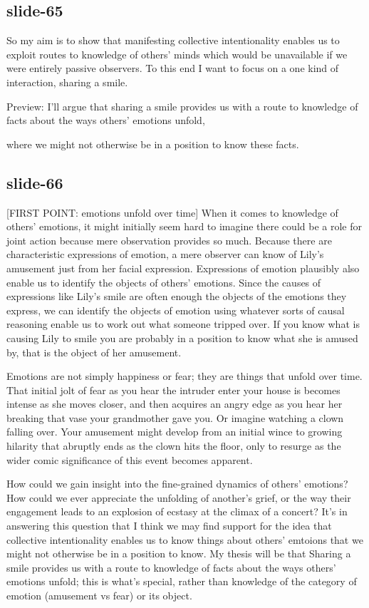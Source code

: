 \documentclass[12pt,\papersize]{extarticle}
\begin{document}
\subsection{slide-65}
So my aim is to show that manifesting collective intentionality enables us to exploit routes to knowledge of others' minds
which would be unavailable if we were entirely passive observers.
To this end I want to focus on a one kind of interaction, sharing a smile.

Preview: I'll argue that sharing a smile provides us with a route to knowledge of facts about the ways others' emotions unfold,

where we might not otherwise be in a position to know these facts.

\subsection{slide-66}
[FIRST POINT: emotions unfold over time]
When it comes to knowledge of others’ emotions, it might initially seem hard to imagine there could be a role for joint action because mere observation provides so much.
Because there are characteristic expressions of emotion, a mere observer can know of Lily’s amusement just from her facial expression.
Expressions of emotion plausibly also enable us to identify the objects of others’ emotions.
Since the causes of expressions like Lily’s smile are often enough the objects of the emotions they express,
we can identify the objects of emotion using whatever sorts of causal reasoning enable us to work out what someone tripped over.
If you know what is causing Lily to smile you are probably in a position to know what she is amused by, that is the object of her amusement.

Emotions are not simply happiness or fear; they are things that unfold over time.
That initial jolt of fear as you hear the intruder enter your house is becomes intense as she moves closer, and then acquires an angry edge as you hear her breaking that vase your grandmother gave you.
Or imagine watching a clown falling over.  Your amusement might develop from an initial wince to growing hilarity that abruptly ends as the clown hits the floor, only to resurge as the wider comic significance of this event becomes apparent.

How could we gain insight into the fine-grained dynamics of others’ emotions?
How could we ever appreciate the unfolding of another’s grief, or the way their engagement leads to an explosion of ecstasy at the climax of a concert?
It's in answering this question that I think we may find support for the idea that collective intentionality enables us to know things about others' emtoions that we might not otherwise be in a position to know.
My thesis will be that Sharing a smile provides us with a route to knowledge of facts about the ways others' emotions unfold; this is what's special, rather than knowledge of the category of emotion (amusement vs fear) or its object.
\end{document}

